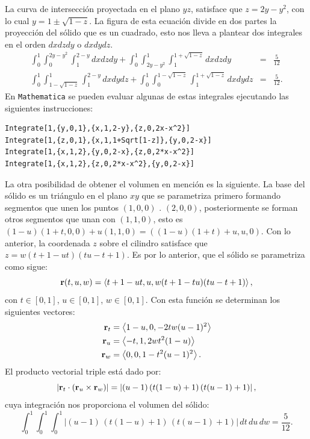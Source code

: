 La curva de intersección proyectada en el plano $yz$, satisface que
$z=2y-y^2$, con lo cual $y=1\pm \sqrt{1-z}$. La figura de esta ecuación divide en dos partes  la proyección del sólido que es un cuadrado, esto nos lleva a plantear dos integrales en el orden $dxdzdy$ o $dxdydz$.
\begin{eqnarray*}
\int_{0}^{1}\int_{0}^{2y-y^2}\int_{1}^{2-y}dxdzdy+\int_{0}^{1}%
\int_{2y-y^2}^{1}\int_{1}^{1+\sqrt{1-z}}dxdzdy &=& \frac{5}{12} \\
\int_{0}^{1}\int_{1-\sqrt{1-z}}^{1}\int_{1}^{2-y}dxdydz+\int_{0}^{1} \int_{0}^{1-\sqrt{1-z}}\int_{1}^{1+\sqrt{1-z}}dxdydz &=& \frac{5}{12}.
\end{eqnarray*}
En \verb"Mathematica" se pueden evaluar algunas de estas integrales ejecutando las siguientes instrucciones:

\begin{tcolorbox}[title=\bf Instrucción en \verb"Mathematica"]\begin{Verbatim}[formatcom=\letraverbatim]
Integrate[1,{y,0,1},{x,1,2-y},{z,0,2x-x^2}]
Integrate[1,{z,0,1},{x,1,1+Sqrt[1-z]},{y,0,2-x}]
Integrate[1,{x,1,2},{y,0,2-x},{z,0,2*x-x^2}]
Integrate[1,{x,1,2},{z,0,2*x-x^2},{y,0,2-x}]
\end{Verbatim}
\end{tcolorbox}

La otra posibilidad de obtener el volumen en mención es la siguiente.
La base del sólido es un triángulo en el plano $xy$ que se parametriza primero formando segmentos que unen los puntos $(1,0,0) $ .
$\left(2,0,0\right)$, posteriormente se forman otros segmentos que unan con $\left( 1,1,0\right) $,
esto es $(1-u)(1+t,0,0)+u(1,1,0)= ((1-u)(1+t)+u,u,0)$.
Con lo anterior, la coordenada $z$ sobre el cilindro satisface que $z=w (t+1-ut)(tu-t+1)$.
Es por lo anterior, que el sólido se parametriza como sigue:
%
\[{\bf r}(t,u,w) =\left\langle t+1-ut,u,w(t+1-tu)(tu-t+1)\right\rangle,\]
con $t\in [0,1]$, $u\in [0,1]$, $w\in [0,1]$. Con esta función se determinan los siguientes vectores:
\begin{align*}
{\bf r}_{t}&= \left\langle 1-u,0,-2tw(u-1)^2\right\rangle \\
{\bf r}_{u}&=\left\langle -t,1,2wt^2(1-u) \right\rangle \\
{\bf r}_{w}&= \left\langle 0,0,1-t^2(u-1)^2\right\rangle.
\end{align*}
El producto vectorial triple está dado por:
\[
\left| {\bf r}_{t}\cdot \left( {\bf r}_{u}\times {\bf r}_{w}\right) \right| =
\left| (u-1)\, (t (1-u)+1)\, (t (u-1)+1) \right|,
\]
cuya integración nos proporciona el volumen del sólido:
\[
\int_{0}^{1} \int_{0}^{1} \int_{0}^{1}
\left| (u-1)\, (t (1-u)+1)\, (t (u-1)+1) \right|
\, dt\, du\, dw = \frac{5}{12}.
\]

